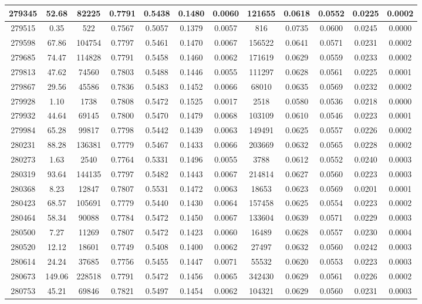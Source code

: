 \documentclass[10pt]{extarticle}
\begin{document}
\begin{longtable}{|c|c|c|c|c|c|c|c|c|c|c|c|}
\hline 
279345&52.68&82225&0.7791&0.5438&0.1480&0.0060&121655&0.0618&0.0552&0.0225&0.0002 \\ 
\hline 
279515&0.35&522&0.7567&0.5057&0.1379&0.0057&816&0.0735&0.0600&0.0245&0.0000 \\ 
\hline 
279598&67.86&104754&0.7797&0.5461&0.1470&0.0067&156522&0.0641&0.0571&0.0231&0.0002 \\ 
\hline 
279685&74.47&114828&0.7791&0.5458&0.1460&0.0062&171619&0.0629&0.0559&0.0233&0.0002 \\ 
\hline 
279813&47.62&74560&0.7803&0.5488&0.1446&0.0055&111297&0.0628&0.0561&0.0225&0.0001 \\ 
\hline 
279867&29.56&45586&0.7836&0.5483&0.1452&0.0066&68010&0.0635&0.0569&0.0232&0.0002 \\ 
\hline 
279928&1.10&1738&0.7808&0.5472&0.1525&0.0017&2518&0.0580&0.0536&0.0218&0.0000 \\ 
\hline 
279932&44.64&69145&0.7800&0.5470&0.1479&0.0068&103109&0.0610&0.0546&0.0223&0.0001 \\ 
\hline 
279984&65.28&99817&0.7798&0.5442&0.1439&0.0063&149491&0.0625&0.0557&0.0226&0.0002 \\ 
\hline 
280231&88.28&136381&0.7779&0.5467&0.1433&0.0066&203669&0.0632&0.0565&0.0228&0.0002 \\ 
\hline 
280273&1.63&2540&0.7764&0.5331&0.1496&0.0055&3788&0.0612&0.0552&0.0240&0.0003 \\ 
\hline 
280319&93.64&144135&0.7797&0.5482&0.1443&0.0067&214814&0.0627&0.0560&0.0223&0.0003 \\ 
\hline 
280368&8.23&12847&0.7807&0.5531&0.1472&0.0063&18653&0.0623&0.0569&0.0201&0.0001 \\ 
\hline 
280423&68.57&105691&0.7779&0.5440&0.1430&0.0064&157458&0.0625&0.0554&0.0223&0.0002 \\ 
\hline 
280464&58.34&90088&0.7784&0.5472&0.1450&0.0067&133604&0.0639&0.0571&0.0229&0.0003 \\ 
\hline 
280500&7.27&11269&0.7807&0.5472&0.1423&0.0060&16489&0.0628&0.0557&0.0230&0.0004 \\ 
\hline 
280520&12.12&18601&0.7749&0.5408&0.1400&0.0062&27497&0.0632&0.0560&0.0242&0.0003 \\ 
\hline 
280614&24.24&37685&0.7756&0.5455&0.1447&0.0071&55532&0.0620&0.0553&0.0223&0.0003 \\ 
\hline 
280673&149.06&228518&0.7791&0.5472&0.1456&0.0065&342430&0.0629&0.0561&0.0226&0.0002 \\ 
\hline 
280753&45.21&69846&0.7821&0.5497&0.1454&0.0062&104321&0.0629&0.0560&0.0231&0.0003 \\ 

\end{longtable}
\end{document}
